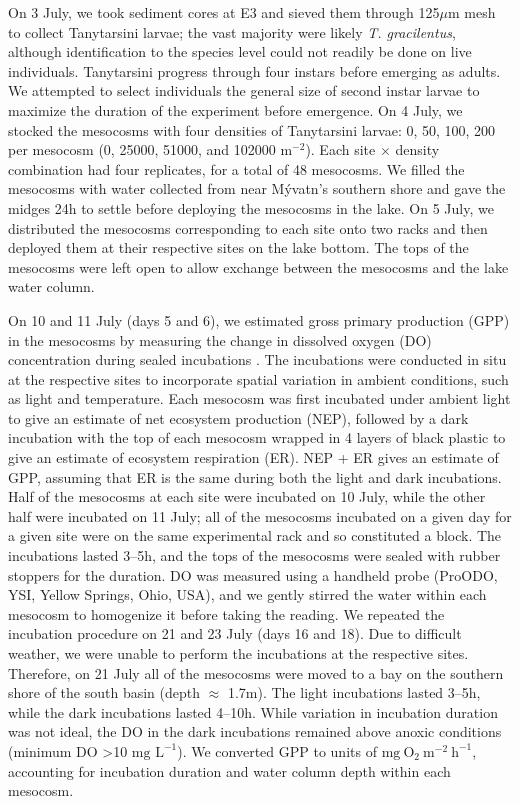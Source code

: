 On 3 July, 
we took sediment cores at E3 and sieved them through 125$\mu \text{m}$ mesh
to collect Tanytarsini larvae; the vast majority were likely \emph{T. gracilentus},
although identification to the species level could not readily be done on live individuals.
Tanytarsini progress through four instars before emerging as adults.
We attempted to select individuals the general size of second instar larvae
to maximize the duration of the experiment before emergence.
On 4 July, we stocked the mesocosms with four densities of Tanytarsini larvae:
0, 50, 100, 200 per mesocosm (0, 25000, 51000, and 102000 $\text{m}^{-2}$). 
Each site $\times$ density combination had four replicates, for a total of 48 mesocosms.
We filled the mesocosms with water collected from near  M\'{y}vatn's southern shore
and gave the midges 24h to settle before deploying the mesocosms in the lake.
On 5 July, 
we distributed the mesocosms corresponding to each site onto two racks and then
deployed them at their respective sites on the lake bottom.
The tops of the mesocosms were left open to allow exchange between the mesocosms
and the lake water column.

On 10 and 11 July (days 5 and 6), 
we estimated gross primary production (GPP) in the mesocosms by measuring the change in
dissolved oxygen (DO) concentration during sealed incubations 
\citep[similar to][]{phillips2019}.
The incubations were conducted in situ at the respective sites to incorporate
spatial variation in ambient conditions, such as light and temperature.
Each mesocosm was first incubated under ambient light to give an
estimate of net ecosystem production (NEP),
followed by a dark incubation with the top of each mesocosm wrapped
in 4 layers of black plastic to give an estimate of ecosystem respiration (ER).
NEP + ER gives an estimate of GPP, assuming that ER is the same during both the light
and dark incubations. Half of the mesocosms at each site were incubated on 10 July,
while the other half were incubated on 11 July;
all of the mesocosms incubated on a given day for a given site were on the same 
experimental rack and so constituted a block.
The incubations lasted 3--5h, 
and the tops of the mesocosms were sealed with rubber stoppers for the duration.
DO was measured using a handheld probe (ProODO, YSI, Yellow Springs, Ohio, USA),
and we gently stirred the water within each mesocosm to homogenize it 
before taking the reading. 
We repeated the incubation procedure on 21 and 23 July (days 16 and 18).
Due to difficult weather, 
we were unable to perform the incubations at the respective sites.
Therefore, on 21 July all of the mesocosms were moved to a bay on the
southern shore of the south basin (depth $\approx$ 1.7m).
The light incubations lasted 3--5h,
while the dark incubations lasted 4--10h.
While variation in incubation duration was not ideal,
the DO in the dark incubations remained above anoxic conditions 
(minimum DO >10 $\text{mg L}^{-1}$). 
We converted GPP to units of $\text{mg}~\text{O}_2~\text{m}^{-2}~\text{h}^{-1}$,
accounting for incubation duration and water column depth within each mesocosm.

